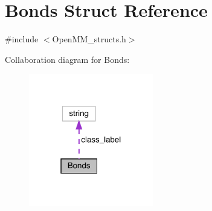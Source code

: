 \hypertarget{structBonds}{}\section{Bonds Struct Reference}
\label{structBonds}


{\ttfamily \#include $<$Open\+M\+M\+\_\+structs.\+h$>$}



Collaboration diagram for Bonds\+:
\nopagebreak
\begin{figure}[H]
\begin{center}
\leavevmode
\includegraphics[width=154pt]{structBonds__coll__graph}
\end{center}
\end{figure}
